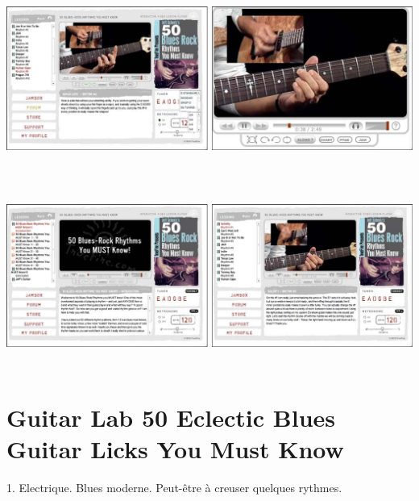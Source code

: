 \documentclass[a4paper]{book}
\begin{document}
\begin{center}
\includegraphics[width=17cm,height=5.976cm]{lebluessupportsmethodes-img84.jpg}
\end{center}


\begin{center}
\includegraphics[width=17cm,height=5.976cm]{lebluessupportsmethodes-img85.jpg}
\end{center}






\clearpage


\section[Guitar Lab 50 Eclectic Blues Guitar Licks You Must
Know]{Guitar Lab 50 Eclectic Blues Guitar Licks You Must Know}
\hypertarget{RefHeadingToc148973218262}{}1. Electrique. Blues moderne.
Peut-\^etre \`a creuser quelques rythmes.
\end{document}
